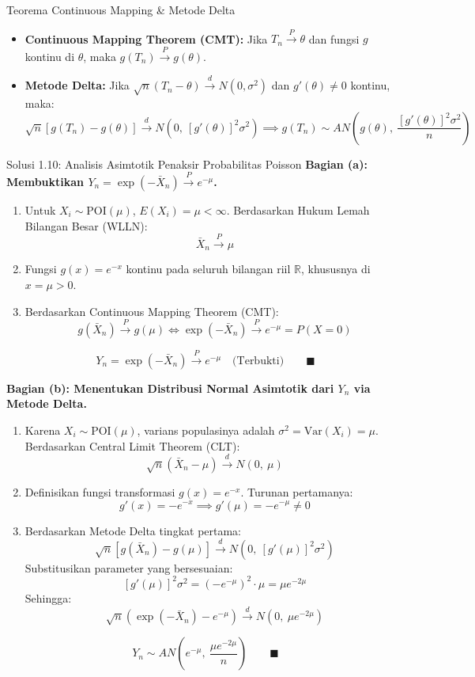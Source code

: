 \documentclass[10pt,twoside]{article}
\begin{document}
\begin{tipbox}{Teorema Continuous Mapping \& Metode Delta}
\begin{itemize}
  \item \textbf{Continuous Mapping Theorem (CMT):} Jika $T_n \xrightarrow{P} \theta$ dan fungsi $g$ kontinu di $\theta$, maka $g(T_n) \xrightarrow{P} g(\theta)$.
  \item \textbf{Metode Delta:} Jika $\sqrt{n}(T_n - \theta) \xrightarrow{d} N(0, \sigma^2)$ dan $g'(\theta) \ne 0$ kontinu, maka:
  \[
  \sqrt{n}[g(T_n) - g(\theta)] \xrightarrow{d} N\left(0, \ [g'(\theta)]^2 \sigma^2\right) \implies g(T_n) \sim AN\left(g(\theta), \ \frac{[g'(\theta)]^2 \sigma^2}{n}\right)
  \]
\end{itemize}
\end{tipbox}

\begin{solbox}{Solusi 1.10: Analisis Asimtotik Penaksir Probabilitas Poisson}
\textbf{Bagian (a): Membuktikan $Y_n = \exp(-\bar{X}_n) \xrightarrow{P} e^{-\mu}$.}
\begin{enumerate}[label=\arabic*.]
  \item Untuk $X_i \sim \text{POI}(\mu)$, $E(X_i) = \mu < \infty$. Berdasarkan Hukum Lemah Bilangan Besar (WLLN):
  \[
  \bar{X}_n \xrightarrow{P} \mu
  \]
  \item Fungsi $g(x) = e^{-x}$ kontinu pada seluruh bilangan riil $\mathbb{R}$, khususnya di $x = \mu > 0$.
  \item Berdasarkan Continuous Mapping Theorem (CMT):
  \[
  g(\bar{X}_n) \xrightarrow{P} g(\mu) \iff \exp(-\bar{X}_n) \xrightarrow{P} e^{-\mu} = P(X = 0)
  \]
\end{enumerate}
\[
\boxed{Y_n = \exp(-\bar{X}_n) \xrightarrow{P} e^{-\mu} \quad \text{(Terbukti)}} \qquad \blacksquare
\]

\textbf{Bagian (b): Menentukan Distribusi Normal Asimtotik dari $Y_n$ via Metode Delta.}
\begin{enumerate}[label=\arabic*.]
  \item Karena $X_i \sim \text{POI}(\mu)$, varians populasinya adalah $\sigma^2 = \mathrm{Var}(X_i) = \mu$.
  Berdasarkan Central Limit Theorem (CLT):
  \[
  \sqrt{n}(\bar{X}_n - \mu) \xrightarrow{d} N(0, \ \mu)
  \]
  \item Definisikan fungsi transformasi $g(x) = e^{-x}$. Turunan pertamanya:
  \[
  g'(x) = -e^{-x} \implies g'(\mu) = -e^{-\mu} \ne 0
  \]
  \item Berdasarkan Metode Delta tingkat pertama:
  \[
  \sqrt{n}[g(\bar{X}_n) - g(\mu)] \xrightarrow{d} N\left(0, \ [g'(\mu)]^2 \sigma^2\right)
  \]
  Substitusikan parameter yang bersesuaian:
  \[
  [g'(\mu)]^2 \sigma^2 = (-e^{-\mu})^2 \cdot \mu = \mu e^{-2\mu}
  \]
  Sehingga:
  \[
  \sqrt{n}\left(\exp(-\bar{X}_n) - e^{-\mu}\right) \xrightarrow{d} N\left(0, \ \mu e^{-2\mu}\right)
  \]
\end{enumerate}
\[
\boxed{Y_n \sim AN\left(e^{-\mu}, \ \frac{\mu e^{-2\mu}}{n}\right)} \qquad \blacksquare
\]


\end{solbox}
\end{document}
